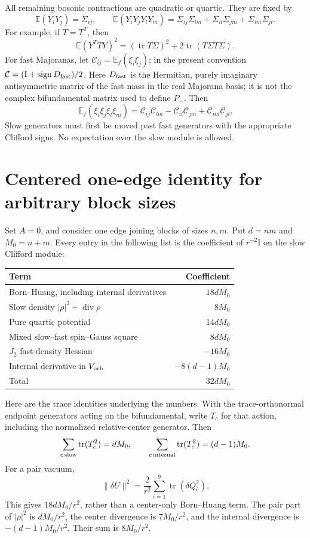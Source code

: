 \documentclass[11pt,letterpaper]{article}
\newcommand{\tr}{\operatorname{tr}}
\newcommand{\E}{\mathbb E}
\newcommand{\calC}{\mathcal C}
\newcommand{\Id}{\mathrm I}
\begin{document}
All remaining bosonic contractions are quadratic or quartic. They are fixed by
\[
 \E(Y_iY_j)=\Sigma_{ij},\qquad
 \E(Y_iY_jY_lY_m)=\Sigma_{ij}\Sigma_{lm}
                +\Sigma_{il}\Sigma_{jm}+\Sigma_{im}\Sigma_{jl}.
\]
For example, if $T=T^T$, then
\[
 \E(Y^TTY)^2=(\tr T\Sigma)^2+2\tr(T\Sigma T\Sigma).
\]
For fast Majoranas, let $\calC_{ij}=\E_f(\xi_i\xi_j)$; in the present convention
$\calC=(\Id+\operatorname{sign}D_{\rm fast})/2$. Here $D_{\rm fast}$ is the Hermitian, purely imaginary antisymmetric matrix of the fast mass in the real Majorana basis; it is not the complex bifundamental matrix used to define $P_-$. Then
\[
 \E_f(\xi_i\xi_j\xi_l\xi_m)=
 \calC_{ij}\calC_{lm}-\calC_{il}\calC_{jm}+\calC_{im}\calC_{jl}.
\]
Slow generators must first be moved past fast generators with the appropriate Clifford signs. No expectation over the slow module is allowed.

\section{Centered one-edge identity for arbitrary block sizes}
Set $A=0$, and consider one edge joining blocks of sizes $n,m$. Put $d=nm$ and $M_0=n+m$. Every entry in the following list is the coefficient of $r^{-2}\Id$ on the slow Clifford module:
\begin{center}
\begin{tabular}{lr}
\toprule
Term & Coefficient\\\midrule
Born--Huang, including internal derivatives & $18dM_0$\\
Slow density $|\rho|^2+\operatorname{div}\rho$ & $8M_0$\\
Pure quartic potential & $14dM_0$\\
Mixed slow--fast spin--Gauss square & $8dM_0$\\
$J_2$ fast-density Hessian & $-16M_0$\\
Internal derivative in $V_{\rm orb}$ & $-8(d-1)M_0$\\\midrule
Total & $32dM_0$\\\bottomrule
\end{tabular}
\end{center}

Here are the trace identities underlying the numbers. With the trace-orthonormal endpoint generators acting on the bifundamental, write $T_c$ for that action, including the normalized relative-center generator. Then
\[
 \sum_{c\,\rm slow}\tr(T_c^2)=dM_0,
 \qquad \sum_{c\,\rm internal}\tr(T_c^2)=(d-1)M_0.
\]
For a pair vacuum,
\[
 \|\delta U\|^2=\frac2{r^2}\sum_{i=1}^9\tr(\delta Q_i^2).
\]
This gives $18dM_0/r^2$, rather than a center-only Born--Huang term. The pair part of $|\rho|^2$ is $dM_0/r^2$, the center divergence is $7M_0/r^2$, and the internal divergence is $-(d-1)M_0/r^2$. Their sum is $8M_0/r^2$.
\end{document}
